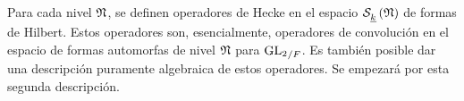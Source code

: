 
Para cada nivel $\frak{N}$, se definen operadores de Hecke en el espacio
$\spitzH{k}{\frak{N}}$ de formas de Hilbert. Estos operadores son,
esencialmente, operadores de convoluci\'{o}n en el espacio de formas automorfas
de nivel $\frak{N}$ para ${\GL_{2}}_{/F}$.
Es tambi\'{e}n posible dar una descripci\'{o}n puramente algebraica de estos
operadores.
Se empezar\'{a} por esta segunda descripci\'{o}n.
